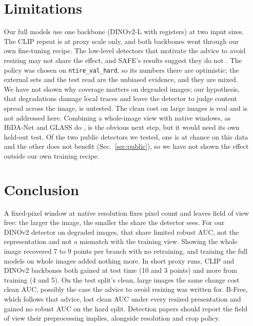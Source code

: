 \documentclass[letterpaper]{article} %
\begin{document}
\section{Limitations}

Our full models use one backbone (DINOv2-L with registers) at two input
sizes. The CLIP repeat is at proxy scale only, and both backbones went
through our own fine-tuning recipe. The
low-level detectors that motivate the advice to avoid resizing may not share
the effect, and SAFE's results suggest they do not \cite{li2025safe}. The
policy was chosen on \texttt{ntire\_val\_hard}, so its numbers there are
optimistic; the external sets and the test read are the unbiased evidence,
and they are mixed. We have not shown why coverage matters on degraded
images; our hypothesis, that degradations damage local traces and leave the
detector to judge content spread across the image, is untested. The clean
cost on large images is real and is not addressed here. Combining a whole-image view with native windows, as
HiDA-Net and GLASS do \cite{mu2026hidanet,han2026glass}, is the obvious next
step, but it would need its own held-out test. Of the two public detectors we
tested, one is at chance on this data and the other does not benefit
(Sec.~\ref{sec:public}), so we have not shown the effect outside our own
training recipe.

\section{Conclusion}

A fixed-pixel window at native resolution fixes pixel count and leaves field
of view free: the larger the image, the smaller the share the detector sees.
For our DINOv2 detector on degraded images, that share limited robust AUC,
not the representation and not a mismatch with the training view. Showing
the whole image recovered 7 to 9 points per branch with no retraining, and
training the full models on whole images added nothing more. In short proxy
runs, CLIP and DINOv2 backbones both gained at test time (10 and 3 points)
and more from training (4 and 5). On the
test split's clean, large images the same change cost clean AUC, possibly the
case the advice to avoid resizing was written for. B-Free, which follows that
advice, lost clean AUC under every resized presentation and gained no robust
AUC on the hard split. Detection papers should report the field of
view their preprocessing implies, alongside resolution and crop policy.


\end{document}
